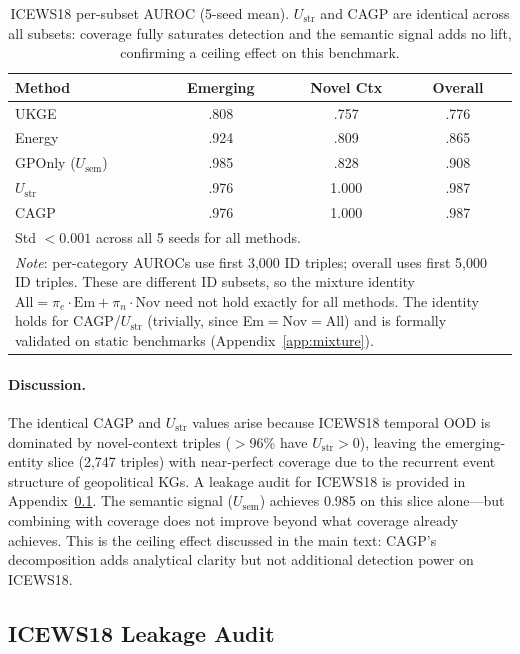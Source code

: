 \documentclass{article}
\begin{document}
\begin{table}[ht]
\centering
\caption{ICEWS18 per-subset AUROC (5-seed mean). $U_{\text{str}}$ and CAGP are identical across all subsets: coverage fully saturates detection and the semantic signal adds no lift, confirming a ceiling effect on this benchmark.}
\label{tab:icews18_subsets}
\small
\begin{tabular}{lccc}
\toprule
Method & Emerging & Novel Ctx & Overall \\
\midrule
UKGE & .808 & .757 & .776 \\
Energy & .924 & .809 & .865 \\
GPOnly ($U_{\text{sem}}$) & .985 & .828 & .908 \\
\midrule
$U_{\text{str}}$ & .976 & 1.000 & .987 \\
CAGP & .976 & 1.000 & .987 \\
\bottomrule
\multicolumn{4}{l}{\scriptsize Std $< 0.001$ across all 5 seeds for all methods.} \\
\multicolumn{4}{p{0.45\textwidth}}{\scriptsize \emph{Note}: per-category AUROCs use first 3{,}000 ID triples; overall uses first 5{,}000 ID triples. These are different ID subsets, so the mixture identity $\text{All} = \pi_e \cdot \text{Em} + \pi_n \cdot \text{Nov}$ need not hold exactly for all methods. The identity holds for CAGP/$U_{\text{str}}$ (trivially, since Em$=$Nov$=$All) and is formally validated on static benchmarks (Appendix~\ref{app:mixture}).}
\end{tabular}
\end{table}

\paragraph{Discussion.}
The identical CAGP and $U_{\text{str}}$ values arise because ICEWS18 temporal OOD is dominated by novel-context triples ($>$96\% have $U_{\text{str}} > 0$), leaving the emerging-entity slice (2,747 triples) with near-perfect coverage due to the recurrent event structure of geopolitical KGs. A leakage audit for ICEWS18 is provided in Appendix~\ref{app:leakage18}. The semantic signal ($U_{\text{sem}}$) achieves 0.985 on this slice alone---but combining with coverage does not improve beyond what coverage already achieves. This is the ceiling effect discussed in the main text: CAGP's decomposition adds analytical clarity but not additional detection power on ICEWS18.

\subsection{ICEWS18 Leakage Audit}
\label{app:leakage18}
\end{document}
